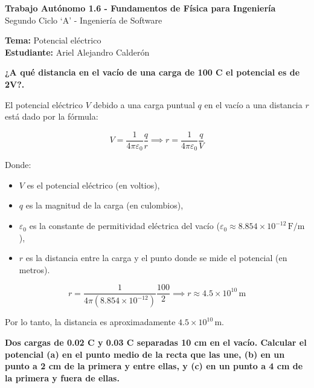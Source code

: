 \documentclass[answers]{exam} %
\begin{document}
\begin{center}
	\large\textbf{Trabajo Autónomo 1.6 - Fundamentos de Física para Ingeniería}\\[1em]
	\large Segundo Ciclo \enquote*{A} - Ingeniería de Software\\[1em]
\end{center}

\vspace{0.5cm}
\noindent
\large\textbf{Tema:} Potencial eléctrico \\
\large\textbf{Estudiante:} Ariel Alejandro Calderón 
\vspace{0.5cm}

\begin{questions}

	\question \large\textbf{¿A qué distancia en el vacío de una carga de 100 C el potencial es de 2V?.}
	\vspace{0.5cm}

	El potencial eléctrico \( V \) debido a una carga puntual \( q \) en el vacío a una distancia \( r \) está dado por la fórmula:

	\[
		V = \frac{1}{4 \pi \varepsilon_0} \frac{q}{r} \implies r = \frac{1}{4 \pi \varepsilon_0} \frac{q}{V}
	\]

	Donde:
	\begin{itemize}
		\item \( V \) es el potencial eléctrico (en voltios),
		\item \( q \) es la magnitud de la carga (en culombios),
		\item \( \varepsilon_0 \) es la constante de permitividad eléctrica del vacío (\( \varepsilon_0 \approx 8.854 \times 10^{-12} \, \text{F/m} \)),
		\item \( r \) es la distancia entre la carga y el punto donde se mide el potencial (en metros).
	\end{itemize}

	\[
		r = \frac{1}{4 \pi (8.854 \times 10^{-12})} \frac{100}{2} \implies r \approx 4.5 \times 10^{10}	 \, \text{m}
	\]


	Por lo tanto, la distancia es aproximadamente \( 4.5 \times 10^{10} \, \text{m} \).

	\vspace{0.5cm}

	\question \large\textbf{Dos cargas de 0.02 C y 0.03 C separadas 10 cm en el vacío. Calcular el potencial (a)
		en el punto medio de la recta que las une, (b) en un punto a 2 cm de la primera y
		entre ellas, y (c) en un punto a 4 cm de la primera y fuera de ellas.}


\end{questions}
\end{document}
